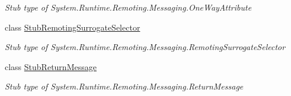 \begin{DoxyCompactItemize}
\begin{DoxyCompactList}\small\item\em Stub type of System.\-Runtime.\-Remoting.\-Messaging.\-One\-Way\-Attribute\end{DoxyCompactList}\item 
class \hyperlink{class_system_1_1_runtime_1_1_remoting_1_1_messaging_1_1_fakes_1_1_stub_remoting_surrogate_selector}{Stub\-Remoting\-Surrogate\-Selector}
\begin{DoxyCompactList}\small\item\em Stub type of System.\-Runtime.\-Remoting.\-Messaging.\-Remoting\-Surrogate\-Selector\end{DoxyCompactList}\item 
class \hyperlink{class_system_1_1_runtime_1_1_remoting_1_1_messaging_1_1_fakes_1_1_stub_return_message}{Stub\-Return\-Message}
\begin{DoxyCompactList}\small\item\em Stub type of System.\-Runtime.\-Remoting.\-Messaging.\-Return\-Message\end{DoxyCompactList}\end{DoxyCompactItemize}
